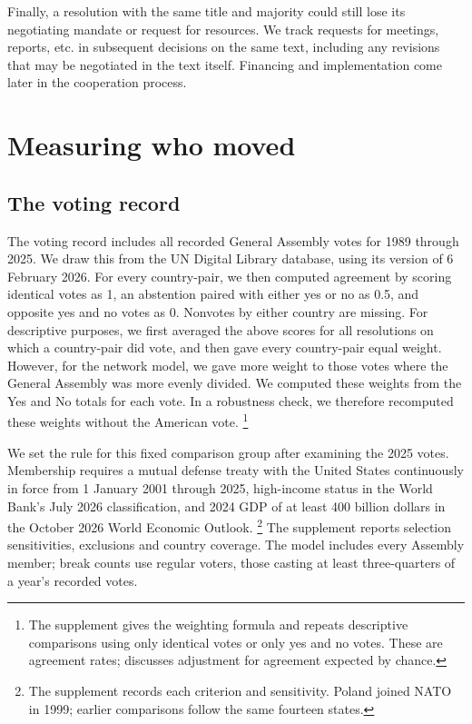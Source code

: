 \documentclass[12pt,authoryear]{elsarticle}
\begin{document}
Finally, a resolution with the same title and majority could still lose its negotiating mandate or request for resources. We track requests for meetings, reports, etc. in subsequent decisions on the same text, including any revisions that may be negotiated in the text itself. Financing and implementation come later in the cooperation process.

\section{Measuring who moved}
\label{sec:model}

\subsection{The voting record}
\label{sec:votes}

The voting record includes all recorded General Assembly votes for 1989 through 2025. We draw this from the UN Digital Library database, using its version of 6 February 2026. For every country-pair, we then computed agreement by scoring identical votes as 1, an abstention paired with either yes or no as 0.5, and opposite yes and no votes as 0. Nonvotes by either country are missing. For descriptive purposes, we first averaged the above scores for all resolutions on which a country-pair did vote, and then gave every country-pair equal weight. However, for the network model, we gave more weight to those votes where the General Assembly was more evenly divided. We computed these weights from the Yes and No totals for each vote. In a robustness check, we therefore recomputed these weights without the American vote. \footnote{The supplement gives the weighting formula and repeats descriptive comparisons using only identical votes or only yes and no votes. These are agreement rates; \citet{hage:2011} discusses adjustment for agreement expected by chance.}

We set the rule for this fixed comparison group after examining the 2025 votes. Membership requires a mutual defense treaty with the United States continuously in force from 1 January 2001 through 2025, high-income status in the World Bank's July 2026 classification, and 2024 GDP of at least 400 billion dollars in the October 2026 World Economic Outlook. \footnote{The supplement records each criterion and sensitivity. Poland joined NATO in 1999; earlier comparisons follow the same fourteen states.} The supplement reports selection sensitivities, exclusions and country coverage. The model includes every Assembly member; break counts use regular voters, those casting at least three-quarters of a year's recorded votes.
\end{document}
